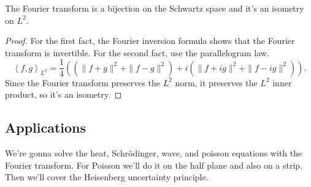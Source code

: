 \begin{proposition}
	The Fourier transform is a bijection on the Schwartz space and it's an isometry on \( L^{2} \).
\end{proposition}
\begin{proof}
	For the first fact, the Fourier inversion formula shows that the Fourier transform is invertible. For the second fact, use the parallelogram law.
	\[ \left\langle f, g \right\rangle_{L^{2}} = \frac{1}{4} \left( \left( \|f + g\|^{2} + \|f - g \|^{2} \right) + i \left( \|f + ig\|^{2} + \|f - ig \|^{2} \right) \right). \]
	Since the Fourier transform preserves the \( L^{2} \) norm, it preserves the \( L^{2} \) inner product, so it's an isometry.
\end{proof}

\subsection{Applications}
We're gonna solve the heat, Schr\"odinger, wave, and poisson equations with the Fourier transform. For Poisson we'll do it on the half plane and also on a strip. Then we'll cover the Heisenberg uncertainty principle.

